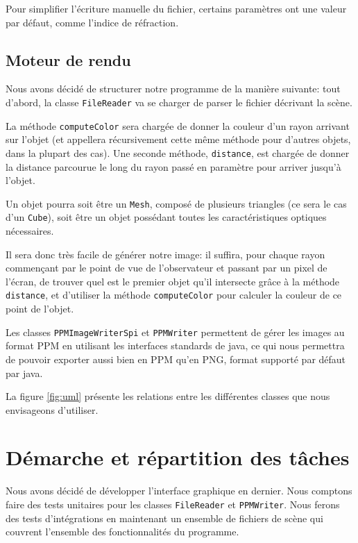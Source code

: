 \documentclass[a4paper]{article}
\begin{document}
    Pour simplifier l'écriture manuelle du fichier,
    certains paramètres ont une valeur par défaut, comme l'indice de réfraction.

  \subsection{Moteur de rendu}
    Nous avons décidé de structurer notre programme de la manière suivante:
    tout d'abord, la classe \verb+FileReader+ va se charger de parser le
    fichier décrivant la scène.

    La méthode \verb+computeColor+ sera chargée de donner la couleur d'un rayon
    arrivant sur l'objet (et appellera récursivement cette même méthode pour
    d'autres objets, dans la plupart des cas).
    Une seconde méthode, \verb+distance+, est chargée de donner la distance
    parcourue le long du rayon passé en paramètre pour arriver jusqu'à l'objet.

    Un objet pourra soit être un \verb+Mesh+, composé de plusieurs triangles
    (ce sera le cas d'un \verb+Cube+), soit être un objet possédant toutes les
    caractéristiques optiques nécessaires.

    Il sera donc très facile de générer notre image: il suffira, pour chaque
    rayon commençant par le point de vue de l'observateur et passant par un
    pixel de l'écran, de trouver quel est le premier objet qu'il intersecte
    grâce à la méthode \verb+distance+, et d'utiliser la méthode
    \verb+computeColor+ pour calculer la couleur de ce point de l'objet.

    Les classes \verb+PPMImageWriterSpi+ et 
    \verb+PPMWriter+ permettent de gérer les images au format
    PPM en utilisant les interfaces standards de java, ce qui nous permettra
    de pouvoir exporter aussi bien en PPM qu'en PNG, format supporté par défaut
    par java.

    La figure \ref{fig:uml} présente les relations entre les différentes classes
    que nous envisageons d'utiliser.

\section{Démarche et répartition des tâches} 
  Nous avons décidé de développer l'interface graphique en dernier. Nous 
  comptons faire des tests unitaires pour les classes
  \verb+FileReader+ et \verb+PPMWriter+. Nous ferons des tests d'intégrations
  en maintenant un ensemble de fichiers de scène qui couvrent l'ensemble des
  fonctionnalités du programme.
\end{document}
